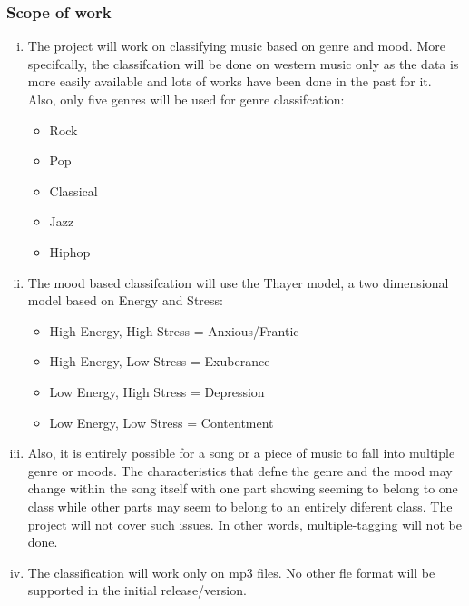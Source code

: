\subsubsection{Scope of work}
\begin{enumerate}[i)]
        \item The project will work on classifying music based on genre and mood. More specifcally, the classifcation will be done on western music only as the data
                is more easily available and lots of works have been done in the past for it. Also, only five genres will be used for genre classifcation:
                \begin{itemize}
                        \item Rock
                        \item Pop
                        \item Classical
                        \item Jazz
                        \item Hiphop
                \end{itemize}

        \item The mood based classifcation will use the Thayer model, a two dimensional model based on Energy and Stress:

                \begin{itemize}
                        \item High Energy, High Stress = Anxious/Frantic

                        \item High Energy, Low Stress = Exuberance

                        \item Low Energy, High Stress = Depression

                        \item Low Energy, Low Stress = Contentment
                \end{itemize}

        \item Also, it is entirely possible for a song or a piece of music to fall into multiple genre or moods. The characteristics that defne the genre
                and the mood may change within the song itself with one part showing seeming to belong to one class while other parts may seem to belong to
                an entirely diferent class. The project will not cover such issues. In other words, multiple-tagging will not be done.

        \item The classification will work only on mp3 files. No other fle format will be supported in the initial release/version.

\end{enumerate}
